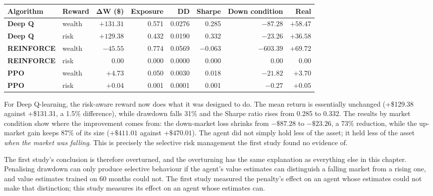 {\def\LTcaptype{none}
\begin{longtable}[]{@{}llrrrrrr@{}}
\toprule\noalign{}
\textbf{Algorithm} & \textbf{Reward} & \textbf{ΔW (\$)} &
\textbf{Exposure} & \textbf{DD} & \textbf{Sharpe} & \textbf{Down condition}
& \textbf{Real} \\
\midrule\noalign{}
\endhead
\bottomrule\noalign{}
\endlastfoot
\textbf{Deep Q} & wealth & \(+131.31\) & 0.571 & 0.0276 & 0.285 & \(-87.28\) & \(+58.47\) \\
\rowsep
\textbf{Deep Q} & risk & \(+129.38\) & 0.432 & 0.0190 & 0.332 & \(-23.26\) & \(+36.58\) \\
\rowsep
\textbf{REINFORCE} & wealth & \(-45.55\) & 0.774 & 0.0569 & −0.063 & \(-603.39\) & \(+69.72\) \\
\rowsep
\textbf{REINFORCE} & risk & \(0.00\) & 0.000 & 0.0000 & 0.000 & \(0.00\) & \(0.00\) \\
\rowsep
\textbf{PPO} & wealth & \(+4.73\) & 0.050 & 0.0030 & 0.018 & \(-21.82\) & \(+3.70\) \\
\rowsep
\textbf{PPO} & risk & \(+0.04\) & 0.001 & 0.0001 & 0.001 & \(-0.27\) & \(+0.05\) \\
\end{longtable}
}

For Deep Q-learning, the risk-aware reward now does what it was designed
to do. The mean return is essentially unchanged (+\$129.38 against
+\$131.31, a 1.5\% difference), while drawdown falls 31\% and the Sharpe
ratio rises from 0.285 to 0.332. The results by market condition show where the
improvement comes from: the down-market loss shrinks from \(-\$87.28\)
to \(-\$23.26\), a 73\% reduction, while the up-market gain keeps 87\%
of its size (\(+\$411.01\) against \(+\$470.01\)). The agent did not
simply hold less of the asset; it held less of the asset \emph{when the
market was falling}. This is precisely the selective risk management the
first study found no evidence of.

The first study's conclusion is therefore overturned, and the overturning has
the same explanation as everything else in this chapter. Penalising
drawdown can only produce selective behaviour if the agent's value
estimates can distinguish a falling market from a rising one, and value
estimates trained on 60 months could not. The first study measured the
penalty's effect on an agent whose estimates could not make that
distinction; this study measures its effect on an agent whose estimates
can.

